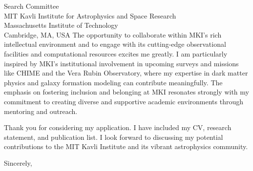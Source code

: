 \documentclass[11pt]{letter}
\begin{document}
\begin{letter}{Search Committee \\ MIT Kavli Institute for Astrophysics and Space Research \\ Massachusetts Institute of Technology \\ Cambridge, MA, USA}
The opportunity to collaborate within MKI’s rich intellectual environment and to engage with its cutting-edge observational facilities and computational resources excites me greatly. I am particularly inspired by MKI’s institutional involvement in upcoming surveys and missions like CHIME and the Vera Rubin Observatory, where my expertise in dark matter physics and galaxy formation modeling can contribute meaningfully. The emphasis on fostering inclusion and belonging at MKI resonates strongly with my commitment to creating diverse and supportive academic environments through mentoring and outreach.

Thank you for considering my application. I have included my CV, research statement, and publication list. I look forward to discussing my potential contributions to the MIT Kavli Institute and its vibrant astrophysics community.

\closing{Sincerely,}

\end{letter}
\end{document}
